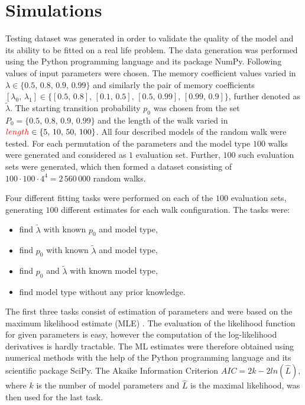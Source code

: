 \documentclass{amsart}
\theoremstyle{definition}
\theoremstyle{plain}
\theoremstyle{plain}
\theoremstyle{plain}
\numberwithin{equation}{section}
\begin{document}
\section{Simulations\label{sec:Simulations}}

Testing dataset was generated in order to validate the quality of
the model and its ability to be fitted on a real life problem. The
data generation was performed using the Python programming language
and its package NumPy. Following values of input parameters were chosen.
The memory coefficient values varied in $\lambda\in\{0.5,\,0.8,\,0.9,\,0.99\}$
and similarly the pair of memory coefficients $[\lambda_{0},\,\lambda_{1}]\in\{[0.5,\,0.8],\,[0.1,\,0.5],\,[0.5,\,0.99],\,[0.99,\,0.9]\}$, further denoted as $\tilde{\lambda}$.
The starting transition probability $p_{0}$ was chosen from the set
$P_{0}=\{0.5,\,0.8,\,0.9,\,0.99\}$ and the length of the walk varied in
\textbf{${\color{red}length}\in\{5,\,10,\,50,\,100\}$}. All four described models of the random walk were tested. For each permutation of the
parameters and the model type $100$ walks were generated and considered as $1$ {\color{red}evaluation set}. Further, $100$ such {\color{red}evaluation sets} were generated, which then formed a dataset consisting of $100\cdot100\cdot4^4=2\,560\,000$ random walks. 

Four different fitting tasks were performed on each of the $100$ {\color{red}evaluation sets}, generating $100$ different estimates for each walk configuration. The tasks were:

\begin{itemize}
\item find $\tilde{\lambda}$ with known $p_{0}$ and model type,
\item find $p_{0}$ with known $\tilde{\lambda}$ and model type,
\item find $p_{0}$ and $\tilde{\lambda}$ with known model type,
\item find model type without any prior knowledge.
\end{itemize}

The first three tasks consist of estimation of parameters and were based on the maximum likelihood estimate (MLE) \cite{rossi2018mathematical}. The evaluation of the likelihood function for given parameters is easy, however the computation of the log-likelihood derivatives is hardly tractable. The ML estimates were therefore obtained using numerical methods with the help of the Python programming language and its scientific package SciPy. The Akaike Information Criterion $AIC=2k-2ln(\hat{L})$, where $k$ is the number of model parameters and $\hat{L}$ is the maximal likelihood, was then used for the last task.
\end{document}
